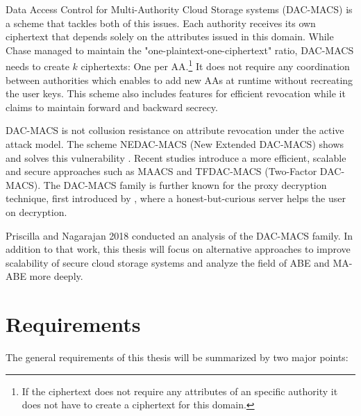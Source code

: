 \documentclass[twocolumn]{article}
\begin{document}

Data Access Control for Multi-Authority Cloud Storage systems (DAC-MACS) \cite{yang2013dac} is a scheme that tackles both of this issues. Each authority receives its own ciphertext that depends solely on the attributes issued in this domain. While Chase managed to maintain the "one-plaintext-one-ciphertext" ratio, DAC-MACS needs to create $k$ ciphertexts: One per AA.\footnote{If the ciphertext does not require any attributes of an specific authority it does not have to create a ciphertext for this domain.} It does not require any coordination between authorities which enables to add new AAs at runtime without recreating the user keys. This scheme also includes features for efficient revocation while it claims to maintain forward and backward secrecy. 

DAC-MACS is not collusion resistance on attribute revocation under the active attack model. The scheme NEDAC-MACS (New Extended DAC-MACS) shows and solves this vulnerability \cite{wu2017security}. Recent studies introduce a more efficient, scalable and secure approaches such as MAACS \cite{li2016secure} and TFDAC-MACS (Two-Factor DAC-MACS)\cite{li2017two}. The DAC-MACS family is further known for the proxy decryption technique, first introduced by \cite{li2013matrix}, where a honest-but-curious server helps the user on decryption.

Priscilla and Nagarajan 2018 \cite{nagarajan2018overview} conducted an analysis of the DAC-MACS family. In addition to that work, this thesis will focus on alternative approaches to improve scalability of secure cloud storage systems and analyze the field of ABE and MA-ABE more deeply.


\section{Requirements}
\label{sec:requirements}
The general requirements of this thesis will be summarized by two major points: 
\end{document}
